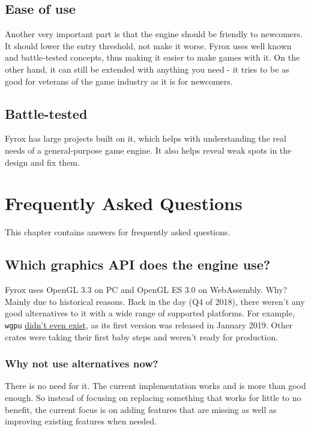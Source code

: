 \documentclass[
]{book}
\theoremstyle{definition}
\theoremstyle{definition}
\theoremstyle{definition}
\theoremstyle{definition}
\theoremstyle{remark}
\begin{document}
\subsection{Ease of use}\label{ease-of-use}

Another very important part is that the engine should be friendly to newcomers. It should lower the entry threshold, not make
it worse. Fyrox uses well known and battle-tested concepts, thus making it easier to make games with it. On the other hand,
it can still be extended with anything you need - it tries to be as good for veterans of the game industry as it is for
newcomers.

\subsection{Battle-tested}\label{battle-tested}

Fyrox has large projects built on it, which helps with understanding the real needs of a general-purpose game engine. It also helps
reveal weak spots in the design and fix them.

\section{Frequently Asked Questions}\label{frequently-asked-questions}

This chapter contains answers for frequently asked questions.

\subsection{Which graphics API does the engine use?}\label{which-graphics-api-does-the-engine-use}

Fyrox uses OpenGL 3.3 on PC and OpenGL ES 3.0 on WebAssembly. Why? Mainly due to historical reasons. Back in the day
(Q4 of 2018), there weren't any good alternatives to it with a wide range of supported platforms. For example, \texttt{wgpu}
\href{https://crates.io/crates/wgpu/0.1.0}{didn't even exist}, as its first version was released in January 2019. Other crates were taking their first baby
steps and weren't ready for production.

\subsubsection{Why not use alternatives now?}\label{why-not-use-alternatives-now}

There is no need for it. The current implementation works and is more than good enough. So instead of focusing on
replacing something that works for little to no benefit, the current focus is on adding features that are missing as
well as improving existing features when needed.
\end{document}

